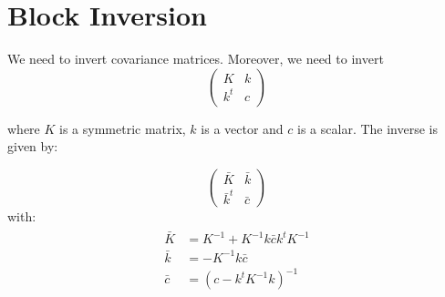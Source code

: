 \documentclass[paper=a4, fontsize=11pt]{scrartcl} %
\numberwithin{equation}{section} %
\numberwithin{figure}{section} %
\numberwithin{table}{section} %
\newcommand{\Kinv}{K^{-1}} %
\begin{document}
\section{Block Inversion}
We need to invert covariance matrices. Moreover, we need to invert
$$ \left( \begin{array}{cc}
K   & k \\
k^t & c \end{array} \right)
$$

where $K$ is a symmetric matrix, $k$ is a vector and $c$ is a scalar.
The inverse is given by:

$$ \left( \begin{array}{cc}
\bar{K}   &  \bar{k} \\
\bar{k}^t   &  \bar{c} \end{array} \right)
$$
with:
\begin{align}
 \begin{split}
\bar{K} &=  \Kinv + K^{-1}k\bar{c}k^t\Kinv\\
\bar{k} &=  -\Kinv k\bar{c}\\
\bar{c} &= (c - k^t\Kinv k)^{-1} 
 \end{split}
\end{align}
\end{document}
